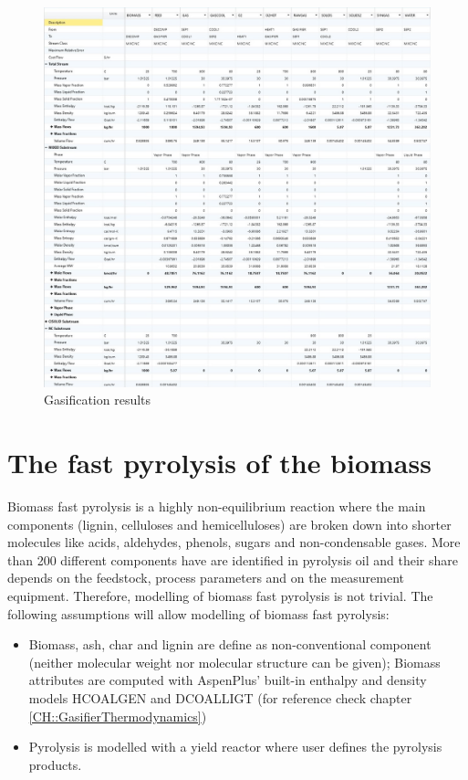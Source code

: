 \newpage %
\begin{figure}[h!]
	\centering
	\includegraphics[width=\linewidth]{Figures/TchermochemicalProcesses/GasificationResults.jpg}
	\caption{Gasification results}
\end{figure}

\newpage
\section{The fast pyrolysis of the biomass}

Biomass fast pyrolysis is a highly non-equilibrium reaction where the main components (lignin, celluloses and hemicelluloses) are broken down into shorter molecules like acids, aldehydes, phenols, sugars and non-condensable gases. More than 200 different components have are identified
in pyrolysis oil and their share depends on the feedstock, process parameters and on the measurement equipment. Therefore, modelling of biomass fast pyrolysis is not trivial. The following assumptions will allow modelling of biomass fast pyrolysis:

\begin{itemize}
	\item Biomass, ash, char and lignin are define as non-conventional component (neither molecular weight nor molecular structure can be given); Biomass attributes are computed with AspenPlus’ built-in enthalpy and density models HCOALGEN and DCOALLIGT (for reference check chapter \ref{CH::GasifierThermodynamics})
	\item Pyrolysis is modelled with a yield reactor where user defines the pyrolysis products.
\end{itemize}

